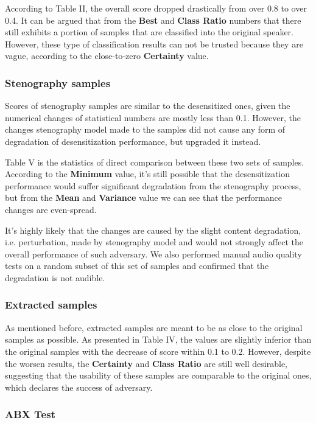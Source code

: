 \documentclass[journal]{IEEEtran} %
\begin{document}
According to Table II, the overall score dropped drastically from over 0.8 to over 0.4. It can be argued that from the \textbf{Best} and \textbf{Class Ratio} numbers that there still exhibits a portion of samples that are classified into the original speaker. However, these type of classification results can not be trusted because they are vague, according to the close-to-zero \textbf{Certainty} value.

\subsubsection{Stenography samples}

Scores of stenography samples are similar to the desensitized ones, given the numerical changes of statistical numbers are mostly less than 0.1. However, the changes stenography model made to the samples did not cause any form of degradation of desensitization performance, but upgraded it instead.

Table V is the statistics of direct comparison between these two sets of samples. According to the \textbf{Minimum} value, it's still possible that the desensitization performance would suffer significant degradation from the stenography process, but from the \textbf{Mean} and \textbf{Variance} value we can see that the performance changes are even-spread.

It's highly likely that the changes are caused by the slight content degradation, i.e. perturbation, made by stenography model and would not strongly affect the overall performance of such adversary. We also performed manual audio quality tests on a random subset of this set of samples and confirmed that the degradation is not audible.

\subsubsection{Extracted samples}

As mentioned before, extracted samples are meant to be as close to the original samples as possible. As presented in Table IV, the values are slightly inferior than the original samples with the decrease of score within 0.1 to 0.2. However, despite the worsen results, the \textbf{Certainty} and \textbf{Class Ratio} are still well desirable, suggesting that the usability of these samples are comparable to the original ones, which declares the success of adversary.

\subsubsection{ABX Test}
\end{document}
